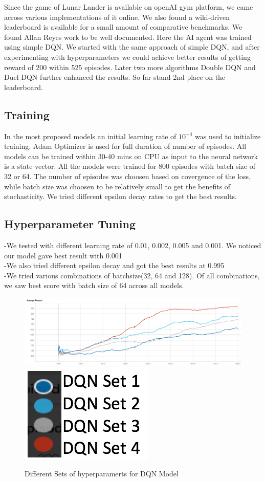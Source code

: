 Since the game of Lunar Lander is available on openAI gym platform, we came across various implementations of it online. We also found a wiki-driven leaderboard \citep{leaderboard} is available for a small amount of comparative benchmarks. We found Allan Reyes \citep{allanreyes} work to be well documented. Here the AI agent was trained using simple DQN. We started with the same approach of simple DQN, and after experimenting with hyperparameters we could achieve better results of getting reward of 200 within 525 episodes. Later two more algorithms Double DQN and Duel DQN further enhanced the results. So far stand 2nd place on the leaderboard.

\subsection{ Training}
In the most proposed models an initial learning rate of $10^{-4}$ was used to initialize training. Adam Optimizer is used for full duration of number of episodes. All models can be trained within 30-40 mins on CPU as input to the neural network is a state vector. All the models were trained for 800 episodes with batch size of 32 or 64. The number of episodes was choosen based on covergence of the loss, while batch size was choosen to be relatively small to get the benefits of stochasticity. We tried different epsilon decay rates to get the best results.




\subsection{ Hyperparameter  Tuning}
-We tested with different learning rate of 0.01, 0.002, 0.005 and 0.001. We noticed our model gave best result with 0.001\\
-We also tried different epsilon decay and got the best results at 0.995\\
-We tried various combinations of batchsize(32, 64 and 128). Of all combinations, we saw best score with batch size of 64 across all models. 
\\



\begin{figure}[!ht]
\includegraphics[scale=0.75,width=0.75\columnwidth]{figures/Hyperparameters1.png}%
\includegraphics[scale=0.15,width=0.15\columnwidth]{figures/Hyperparameters_legends1.png}%
\caption{ Different Sets of hyperparamerts for DQN Model}%
\label{fig:HyperParameter Table}%
\end{figure}



